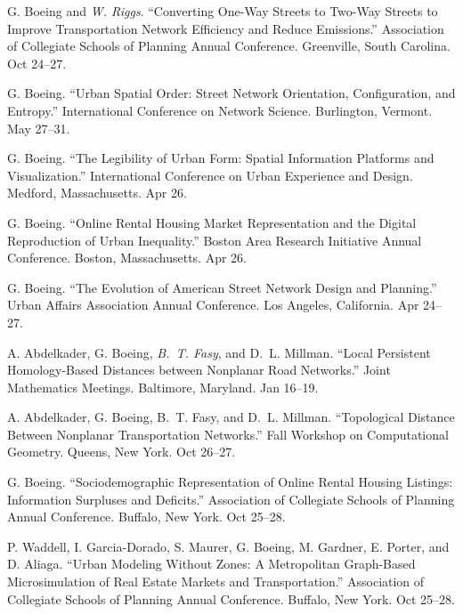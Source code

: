 \documentclass[11pt,a4paper]{report} %
\begin{document}
\begin{tablist}
\item[2019] \tab{}G. Boeing and \textit{W. Riggs}. \enquote{Converting One-Way Streets to Two-Way Streets to Improve Transportation Network Efficiency and Reduce Emissions.} Association of Collegiate Schools of Planning Annual Conference. Greenville, South Carolina. Oct 24--27.

\item[2019] \tab{}G. Boeing. \enquote{Urban Spatial Order: Street Network Orientation, Configuration, and Entropy.} International Conference on Network Science. Burlington, Vermont. May 27--31.

\item[2019] \tab{}G. Boeing. \enquote{The Legibility of Urban Form: Spatial Information Platforms and Visualization.} International Conference on Urban Experience and Design. Medford, Massachusetts. Apr 26.

\item[2019] \tab{}G. Boeing. \enquote{Online Rental Housing Market Representation and the Digital Reproduction of Urban Inequality.} Boston Area Research Initiative Annual Conference. Boston, Massachusetts. Apr 26.

\item[2019] \tab{}G. Boeing. \enquote{The Evolution of American Street Network Design and Planning.} Urban Affairs Association Annual Conference. Los Angeles, California. Apr 24--27.

\item[2019] \tab{}A. Abdelkader, G. Boeing, \textit{B.~T. Fasy}, and D.~L. Millman. \enquote{Local Persistent Homology-Based Distances between Nonplanar Road Networks.} Joint Mathematics Meetings. Baltimore, Maryland. Jan 16--19.

\item[2018] \tab{}A. Abdelkader, G. Boeing, B.~T. Fasy, and D.~L. Millman. \enquote{Topological Distance Between Nonplanar Transportation Networks.} Fall Workshop on Computational Geometry. Queens, New York. Oct 26--27.

\item[2018] \tab{}G. Boeing. \enquote{Sociodemographic Representation of Online Rental Housing Listings: Information Surpluses and Deficits.} Association of Collegiate Schools of Planning Annual Conference. Buffalo, New York. Oct 25--28.

\item[2018] \tab{}P. Waddell, I. Garcia-Dorado, S. Maurer, G. Boeing, M. Gardner, E. Porter, and D. Aliaga. \enquote{Urban Modeling Without Zones: A Metropolitan Graph-Based Microsimulation of Real Estate Markets and Transportation.} Association of Collegiate Schools of Planning Annual Conference. Buffalo, New York. Oct 25--28.


\end{tablist}
\end{document}
